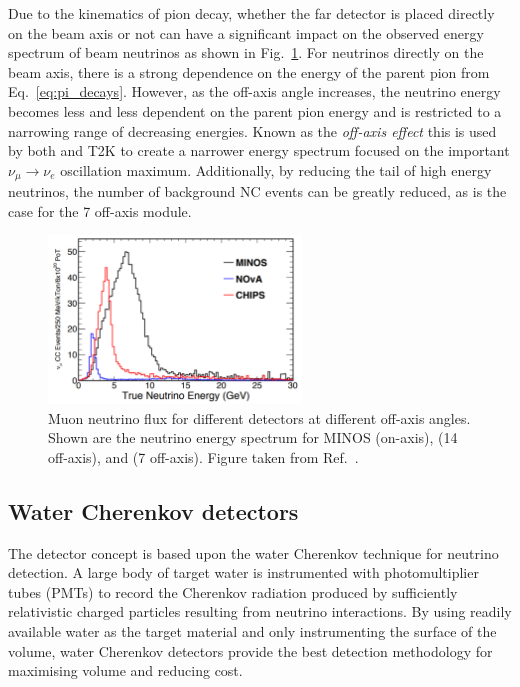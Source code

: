 Due to the kinematics of pion decay, whether the far detector is placed directly on the beam axis
or not can have a significant impact on the observed energy spectrum of beam neutrinos as shown in
Fig.~\ref{fig:numi_axis}. For neutrinos directly on the beam axis, there is a strong dependence on
the energy of the parent pion from Eq.~\ref{eq:pi_decays}. However, as the off-axis angle
increases, the neutrino energy becomes less and less dependent on the parent pion energy and is
restricted to a narrowing range of decreasing energies. Known as the \emph{off-axis effect} this
is used by both \nova and T2K to create a narrower energy spectrum focused on the important
$\nu_{\mu}\rightarrow\nu_{e}$ oscillation maximum. Additionally, by reducing the tail of high
energy neutrinos, the number of background NC events can be greatly reduced, as is the case for
the \unit{7}{} off-axis \chipsfive module.

\begin{figure} %
    \includegraphics[width=0.6\textwidth]{diagrams/4-chips/numi_axis.pdf}
    \caption[Muon neutrino flux for different \numi detectors at different off-axis angles]
    {Muon neutrino flux for different \numi detectors at different off-axis angles. Shown are the
        neutrino energy spectrum for MINOS (on-axis), \nova (\unit{14}{} off-axis),
        and \chipsfive (\unit{7}{} off-axis). Figure taken from
        Ref.~\cite{adamson2013}.}
    \label{fig:numi_axis}
\end{figure}

\subsection{Water Cherenkov detectors} %
\label{sec:chips_concept_cherenkov} %

The \chips detector concept is based upon the water Cherenkov technique for neutrino detection. A
large body of target water is instrumented with photomultiplier tubes (PMTs) to record the
Cherenkov radiation produced by sufficiently relativistic charged particles resulting from
neutrino interactions. By using readily available water as the target material and only
instrumenting the surface of the volume, water Cherenkov detectors provide the best detection
methodology for maximising volume and reducing cost.

